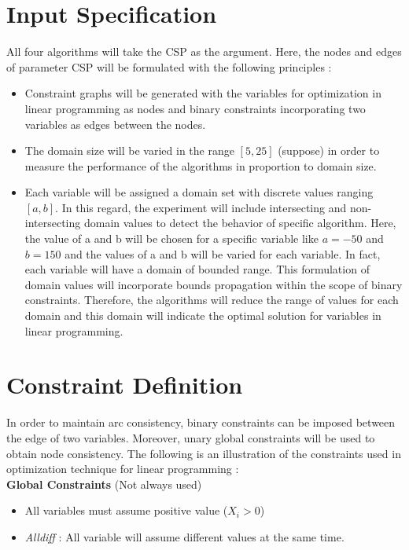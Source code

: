 \documentclass[a4paper]{article}
\begin{document}
\section*{Input Specification}
All four algorithms will take the CSP as the argument. Here, the nodes and edges of parameter CSP will be formulated with the following principles :
\begin{itemize}
	\item Constraint graphs will be generated with the variables for optimization in linear programming as nodes and binary constraints incorporating two variables as edges between the nodes.
	\item The domain size will be varied in the range $ [5, 25] $ (suppose) in order to measure the performance of the algorithms in proportion to domain size.
	\item Each variable will be assigned a domain set with discrete values ranging $ [a, b] $. In this regard, the experiment will include intersecting and non-intersecting domain values to detect the behavior of specific algorithm. Here, the value of a and b will be chosen for a specific variable like $ a = -50 $ and $ b = 150 $ and the values of a and b will be varied for each variable. In fact, each variable will have a domain of bounded range. This formulation of domain values will incorporate bounds propagation within the scope of binary constraints. Therefore, the algorithms will reduce the range of values for each domain and this domain will indicate the optimal solution for variables in linear programming. 
\end{itemize}
\section*{Constraint Definition}
In order to maintain arc consistency, binary constraints can be imposed between the edge of two variables. Moreover, unary global constraints will be used to obtain node consistency. The following is an illustration of the constraints used in optimization technique for linear programming :\\

\textbf{Global Constraints} (Not always used)
\begin{itemize}
	\item All variables must assume positive value ($ X_{i}>0 $)
	\item \textit{Alldiff} : All variable will assume different values at the same time.
\end{itemize}
\end{document}
